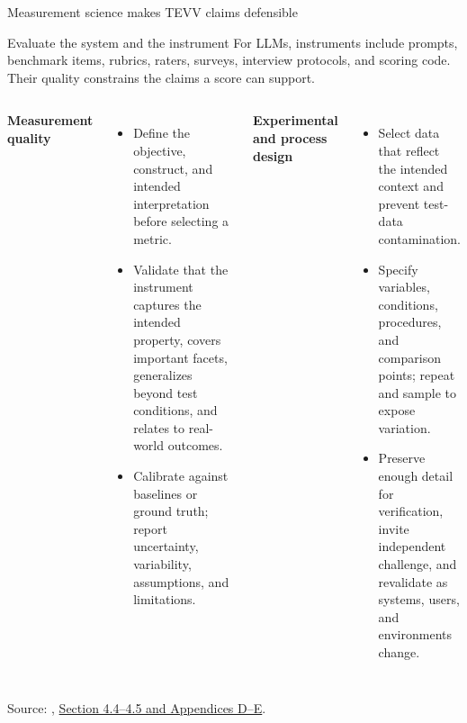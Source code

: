\documentclass[aspectratio=169]{beamer}
\newcommand{\slidesource}[1]{\vfill\tiny\color{hrgray}Source: #1.}
\begin{document}
\begin{frame}{Measurement science makes TEVV claims defensible}
\footnotesize
\begin{block}{Evaluate the system and the instrument}
For LLMs, instruments include prompts, benchmark items, rubrics, raters, surveys, interview protocols, and scoring code. Their quality constrains the claims a score can support.
\end{block}
\begin{columns}[T]
\textbf{Measurement quality}
\begin{itemize}
  \item Define the objective, construct, and intended interpretation before selecting a metric.
  \item Validate that the instrument captures the intended property, covers important facets, generalizes beyond test conditions, and relates to real-world outcomes.
  \item Calibrate against baselines or ground truth; report uncertainty, variability, assumptions, and limitations.
\end{itemize}
\textbf{Experimental and process design}
\begin{itemize}
  \item Select data that reflect the intended context and prevent test-data contamination.
  \item Specify variables, conditions, procedures, and comparison points; repeat and sample to expose variation.
  \item Preserve enough detail for verification, invite independent challenge, and revalidate as systems, users, and environments change.
\end{itemize}
\end{columns}
\slidesource{\parencite{Phillips2026TEVVAthlon}, \href{https://doi.org/10.6028/NIST.AI.200-2.ipd}{Section 4.4--4.5 and Appendices D--E}}
\end{frame}
\end{document}
